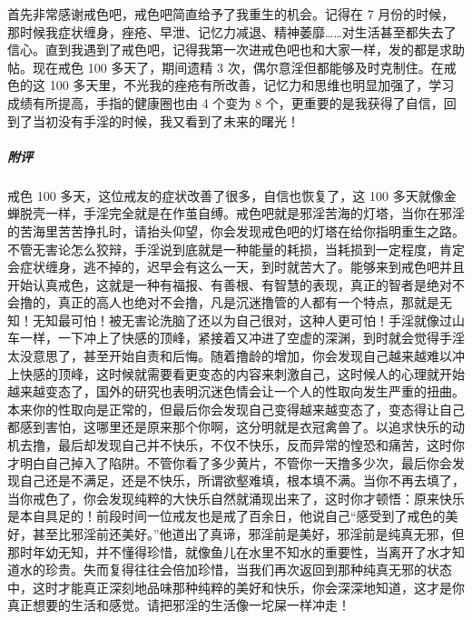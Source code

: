 \begin{case}
    首先非常感谢戒色吧，戒色吧简直给予了我重生的机会。记得在 7 月份的时候，那时候我症状缠身，痤疮、早泄、记忆力减退、精神萎靡……对生活甚至都失去了信心。直到我遇到了戒色吧，记得我第一次进戒色吧也和大家一样，发的都是求助帖。现在戒色 100 多天了，期间遗精 3 次，偶尔意淫但都能够及时克制住。在戒色的这 100 多天里，不光我的痤疮有所改善，记忆力和思维也明显加强了，学习成绩有所提高，手指的健康圈也由 4 个变为 8 个，更重要的是我获得了自信，回到了当初没有手淫的时候，我又看到了未来的曙光！
    \subparagraph{附评} 戒色 100 多天，这位戒友的症状改善了很多，自信也恢复了，这 100 多天就像金蝉脱壳一样，手淫完全就是在作茧自缚。戒色吧就是邪淫苦海的灯塔，当你在邪淫的苦海里苦苦挣扎时，请抬头仰望，你会发现戒色吧的灯塔在给你指明重生之路。不管无害论怎么狡辩，手淫说到底就是一种能量的耗损，当耗损到一定程度，肯定会症状缠身，逃不掉的，迟早会有这么一天，到时就苦大了。能够来到戒色吧并且开始认真戒色，这就是一种有福报、有善根、有智慧的表现，真正的智者是绝对不会撸的，真正的高人也绝对不会撸，凡是沉迷撸管的人都有一个特点，那就是无知！无知最可怕！被无害论洗脑了还以为自己很对，这种人更可怕！手淫就像过山车一样，一下冲上了快感的顶峰，紧接着又冲进了空虚的深渊，到时就会觉得手淫太没意思了，甚至开始自责和后悔。随着撸龄的增加，你会发现自己越来越难以冲上快感的顶峰，这时候就需要看更变态的内容来刺激自己，这时候人的心理就开始越来越变态了，国外的研究也表明沉迷色情会让一个人的性取向发生严重的扭曲。本来你的性取向是正常的，但最后你会发现自己变得越来越变态了，变态得让自己都感到害怕，这哪里还是原来那个你啊，这分明就是衣冠禽兽了。以追求快乐的动机去撸，最后却发现自己并不快乐，不仅不快乐，反而异常的惶恐和痛苦，这时你才明白自己掉入了陷阱。不管你看了多少黄片，不管你一天撸多少次，最后你会发现自己还是不满足，还是不快乐，所谓欲壑难填，根本填不满。当你不再去填了，当你戒色了，你会发现纯粹的大快乐自然就涌现出来了，这时你才顿悟：原来快乐是本自具足的！前段时间一位戒友也是戒了百余日，他说自己“感受到了戒色的美好，甚至比邪淫前还美好。”他道出了真谛，邪淫前是美好，邪淫前是纯真无邪，但那时年幼无知，并不懂得珍惜，就像鱼儿在水里不知水的重要性，当离开了水才知道水的珍贵。失而复得往往会倍加珍惜，当我们再次返回到那种纯真无邪的状态中，这时才能真正深刻地品味那种纯粹的美好和快乐，你会深深地知道，这才是你真正想要的生活和感觉。请把邪淫的生活像一坨屎一样冲走！
\end{case}

